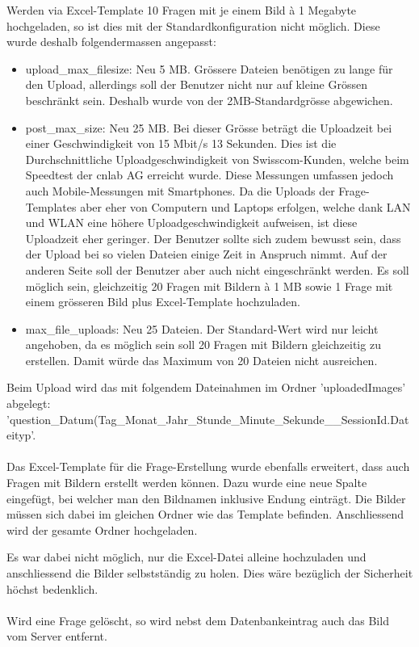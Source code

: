 Werden via Excel-Template 10 Fragen mit je einem Bild à 1 Megabyte hochgeladen, so ist dies mit der Standardkonfiguration nicht möglich. Diese wurde deshalb folgendermassen angepasst:
\begin{itemize}
	\item upload\_max\_filesize: Neu 5 MB. Grössere Dateien benötigen zu lange für den Upload, allerdings soll der Benutzer nicht nur auf kleine Grössen beschränkt sein. Deshalb wurde von der 2MB-Standardgrösse abgewichen.
	\item post\_max\_size: Neu 25 MB. Bei dieser Grösse beträgt die Uploadzeit bei einer Geschwindigkeit von 15 Mbit/s 13 Sekunden. Dies ist die Durchschnittliche Uploadgeschwindigkeit von Swisscom-Kunden, welche beim Speedtest der cnlab AG \cite{cnlab_speedtest} erreicht wurde. Diese Messungen umfassen jedoch auch Mobile-Messungen mit Smartphones. Da die Uploads der Frage-Templates aber eher von Computern und Laptops erfolgen, welche dank LAN und WLAN eine höhere Uploadgeschwindigkeit aufweisen, ist diese Uploadzeit eher geringer. Der Benutzer sollte sich zudem bewusst sein, dass der Upload bei so vielen Dateien einige Zeit in Anspruch nimmt.
	Auf der anderen Seite soll der Benutzer aber auch nicht eingeschränkt werden. Es soll möglich sein, gleichzeitig 20 Fragen mit Bildern à 1 MB sowie 1 Frage mit einem grösseren Bild plus Excel-Template hochzuladen.
	\item max\_file\_uploads: Neu 25 Dateien. Der Standard-Wert wird nur leicht angehoben, da es möglich sein soll 20 Fragen mit Bildern gleichzeitig zu erstellen. Damit würde das Maximum von 20 Dateien nicht ausreichen.
\end{itemize}

Beim Upload wird das mit folgendem Dateinahmen im Ordner 'uploadedImages' abgelegt: 'question\_Datum(Tag\_Monat\_Jahr\_Stunde\_Minute\_Sekunde\_\_SessionId.Dateityp'.
\\
\\
Das Excel-Template für die Frage-Erstellung wurde ebenfalls erweitert, dass auch Fragen mit Bildern erstellt werden können. Dazu wurde eine neue Spalte eingefügt, bei welcher man den Bildnamen inklusive Endung einträgt. Die Bilder müssen sich dabei im gleichen Ordner wie das Template befinden. Anschliessend wird der gesamte Ordner hochgeladen.

Es war dabei nicht möglich, nur die Excel-Datei alleine hochzuladen und anschliessend die Bilder selbstständig zu holen. Dies wäre bezüglich der Sicherheit höchst bedenklich.
\\
\\
Wird eine Frage gelöscht, so wird nebst dem Datenbankeintrag auch das Bild vom Server entfernt.


